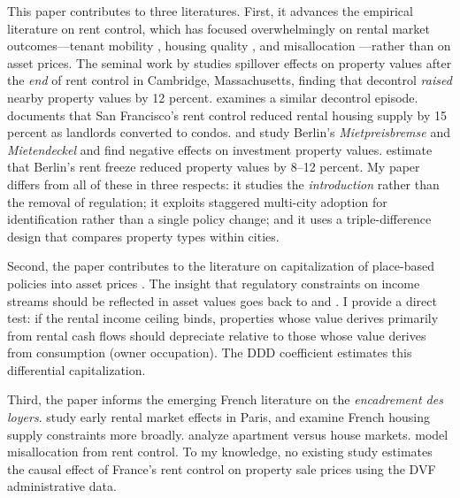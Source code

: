 \documentclass[12pt]{article}
\begin{document}
This paper contributes to three literatures. First, it advances the empirical literature on rent control, which has focused overwhelmingly on rental market outcomes---tenant mobility \citep{diamond2019effects}, housing quality \citep{early2000rent, gyourko1990rent}, and misallocation \citep{glaeser2003rent, arnott1995time}---rather than on asset prices. The seminal work by \citet{autor2014housing} studies spillover effects on property values after the \emph{end} of rent control in Cambridge, Massachusetts, finding that decontrol \emph{raised} nearby property values by 12 percent. \citet{sims2007out} examines a similar decontrol episode. \citet{diamond2019effects} documents that San Francisco's rent control reduced rental housing supply by 15 percent as landlords converted to condos. \citet{breidenbach2022rent} and \citet{mense2023secondary} study Berlin's \emph{Mietpreisbremse} and \emph{Mietendeckel} and find negative effects on investment property values. \citet{ahlfeldt2022mietendeckel} estimate that Berlin's rent freeze reduced property values by 8--12 percent. My paper differs from all of these in three respects: it studies the \emph{introduction} rather than the removal of regulation; it exploits staggered multi-city adoption for identification rather than a single policy change; and it uses a triple-difference design that compares property types within cities.

Second, the paper contributes to the literature on capitalization of place-based policies into asset prices \citep{harding2012capitalization}. The insight that regulatory constraints on income streams should be reflected in asset values goes back to \citet{olsen1972competitive} and \citet{stull1978implicit}. I provide a direct test: if the rental income ceiling binds, properties whose value derives primarily from rental cash flows should depreciate relative to those whose value derives from consumption (owner occupation). The DDD coefficient estimates this differential capitalization.

Third, the paper informs the emerging French literature on the \emph{encadrement des loyers}. \citet{bonnefoy2021encadrement} study early rental market effects in Paris, and \citet{chapelle2019housing} examine French housing supply constraints more broadly. \citet{bono2022housing} analyze apartment versus house markets. \citet{adda2023rent} model misallocation from rent control. To my knowledge, no existing study estimates the causal effect of France's rent control on property sale prices using the DVF administrative data.
\end{document}
